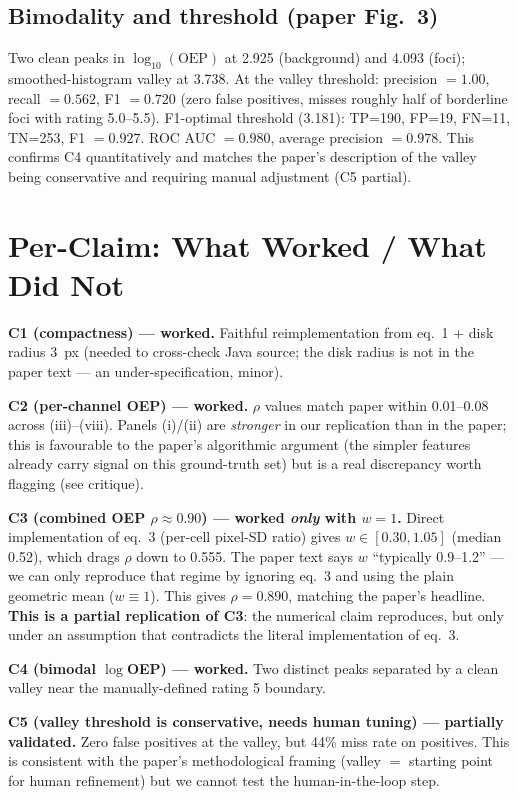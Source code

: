 \documentclass[11pt]{article}
\begin{document}
\subsection{Bimodality and threshold (paper Fig.~3)}
Two clean peaks in $\log_{10}(\mathrm{OEP})$ at 2.925 (background) and 4.093 (foci); smoothed-histogram valley at 3.738. At the valley threshold: precision $=1.00$, recall $=0.562$, F1 $=0.720$ (zero false positives, misses roughly half of borderline foci with rating 5.0--5.5). F1-optimal threshold (3.181): TP=190, FP=19, FN=11, TN=253, F1 $=0.927$. ROC AUC $=0.980$, average precision $=0.978$. This confirms C4 quantitatively and matches the paper's description of the valley being conservative and requiring manual adjustment (C5 partial).

\section{Per-Claim: What Worked / What Did Not}

\textbf{C1 (compactness) --- worked.} Faithful reimplementation from eq.~1 + disk radius 3~px (needed to cross-check Java source; the disk radius is not in the paper text --- an under-specification, minor).

\textbf{C2 (per-channel OEP) --- worked.} $\rho$ values match paper within 0.01--0.08 across (iii)--(viii). Panels (i)/(ii) are \emph{stronger} in our replication than in the paper; this is favourable to the paper's algorithmic argument (the simpler features already carry signal on this ground-truth set) but is a real discrepancy worth flagging (see critique).

\textbf{C3 (combined OEP $\rho \approx 0.90$) --- worked \emph{only} with $w=1$.} Direct implementation of eq.~3 (per-cell pixel-SD ratio) gives $w \in [0.30, 1.05]$ (median 0.52), which drags $\rho$ down to 0.555. The paper text says $w$ ``typically 0.9--1.2'' --- we can only reproduce that regime by ignoring eq.~3 and using the plain geometric mean ($w \equiv 1$). This gives $\rho = 0.890$, matching the paper's headline. \textbf{This is a partial replication of C3}: the numerical claim reproduces, but only under an assumption that contradicts the literal implementation of eq.~3.

\textbf{C4 (bimodal $\log$OEP) --- worked.} Two distinct peaks separated by a clean valley near the manually-defined rating 5 boundary.

\textbf{C5 (valley threshold is conservative, needs human tuning) --- partially validated.} Zero false positives at the valley, but 44\% miss rate on positives. This is consistent with the paper's methodological framing (valley $=$ starting point for human refinement) but we cannot test the human-in-the-loop step.
\end{document}
